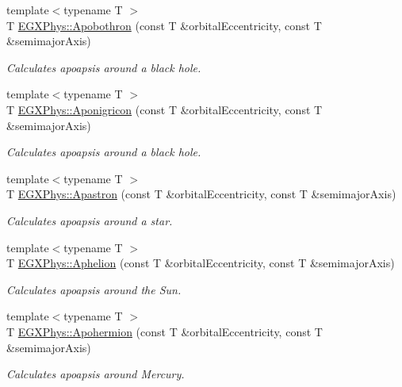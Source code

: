 \begin{DoxyCompactItemize}
{\footnotesize template$<$typename T $>$ }\\T \mbox{\hyperlink{group___e_g_x_phys-_apoapsis_ga6fe084b9e69f47a5032b05aa8f6bf7ad}{E\+G\+X\+Phys\+::\+Apobothron}} (const T \&orbital\+Eccentricity, const T \&semimajor\+Axis)
\begin{DoxyCompactList}\small\item\em Calculates apoapsis around a black hole. \end{DoxyCompactList}\item 
{\footnotesize template$<$typename T $>$ }\\T \mbox{\hyperlink{group___e_g_x_phys-_apoapsis_ga83e866e2f887ff8eafbc3971d4cab8be}{E\+G\+X\+Phys\+::\+Aponigricon}} (const T \&orbital\+Eccentricity, const T \&semimajor\+Axis)
\begin{DoxyCompactList}\small\item\em Calculates apoapsis around a black hole. \end{DoxyCompactList}\item 
{\footnotesize template$<$typename T $>$ }\\T \mbox{\hyperlink{group___e_g_x_phys-_apoapsis_ga2fc1c406ce10f59b4f325150aecd279a}{E\+G\+X\+Phys\+::\+Apastron}} (const T \&orbital\+Eccentricity, const T \&semimajor\+Axis)
\begin{DoxyCompactList}\small\item\em Calculates apoapsis around a star. \end{DoxyCompactList}\item 
{\footnotesize template$<$typename T $>$ }\\T \mbox{\hyperlink{group___e_g_x_phys-_apoapsis_ga77dadb4d082a441c8e85203c983722c7}{E\+G\+X\+Phys\+::\+Aphelion}} (const T \&orbital\+Eccentricity, const T \&semimajor\+Axis)
\begin{DoxyCompactList}\small\item\em Calculates apoapsis around the Sun. \end{DoxyCompactList}\item 
{\footnotesize template$<$typename T $>$ }\\T \mbox{\hyperlink{group___e_g_x_phys-_apoapsis_gab002349e578241b3514f2212da9a7d48}{E\+G\+X\+Phys\+::\+Apohermion}} (const T \&orbital\+Eccentricity, const T \&semimajor\+Axis)
\begin{DoxyCompactList}\small\item\em Calculates apoapsis around Mercury. \end{DoxyCompactList}\item 

\end{DoxyCompactItemize}
